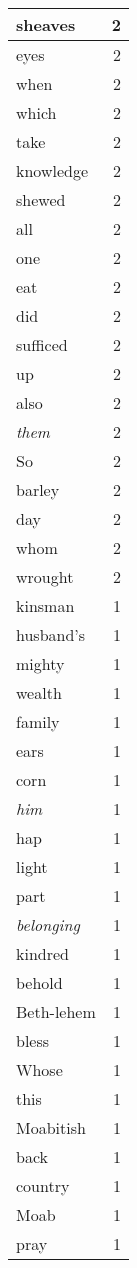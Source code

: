 \begin{center}
\begin{longtable}{l|r}
sheaves & 2 \\ \hline
eyes & 2 \\ \hline
when & 2 \\ \hline
which & 2 \\ \hline
take & 2 \\ \hline
knowledge & 2 \\ \hline
shewed & 2 \\ \hline
all & 2 \\ \hline
one & 2 \\ \hline
eat & 2 \\ \hline
did & 2 \\ \hline
sufficed & 2 \\ \hline
up & 2 \\ \hline
also & 2 \\ \hline
\emph{them} & 2 \\ \hline
So & 2 \\ \hline
barley & 2 \\ \hline
day & 2 \\ \hline
whom & 2 \\ \hline
wrought & 2 \\ \hline
kinsman & 1 \\ \hline
husband's & 1 \\ \hline
mighty & 1 \\ \hline
wealth & 1 \\ \hline
family & 1 \\ \hline
ears & 1 \\ \hline
corn & 1 \\ \hline
\emph{him} & 1 \\ \hline
hap & 1 \\ \hline
light & 1 \\ \hline
part & 1 \\ \hline
\emph{belonging} & 1 \\ \hline
kindred & 1 \\ \hline
behold & 1 \\ \hline
Beth-lehem & 1 \\ \hline
bless & 1 \\ \hline
Whose & 1 \\ \hline
this & 1 \\ \hline
Moabitish & 1 \\ \hline
back & 1 \\ \hline
country & 1 \\ \hline
Moab & 1 \\ \hline
pray & 1 \\ \hline

\end{longtable}
\end{center}
